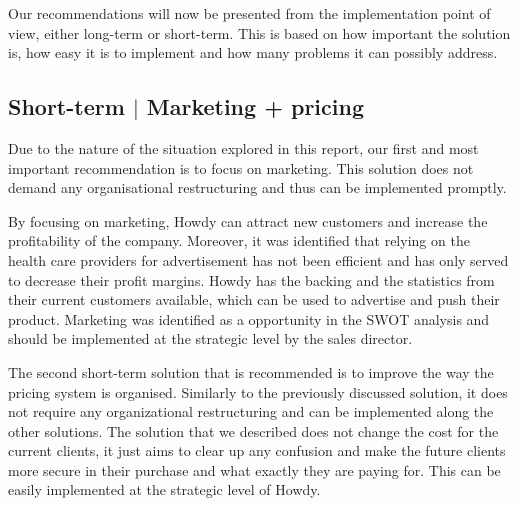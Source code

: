 Our recommendations will now be presented from the implementation point of view, either long-term or short-term. This is based on how important the solution is, how easy it is to implement and how many problems it can possibly address.



\subsection{Short-term $|$ Marketing + pricing}
Due to the nature of the situation explored in this report, our first and most important recommendation is to focus on marketing. This solution does not demand any organisational restructuring and thus can be implemented promptly.

\noindent By focusing on marketing, Howdy can attract new customers and increase the profitability of the company. Moreover, it was identified that relying on the health care providers for advertisement has not been efficient and has only served to decrease their profit margins. Howdy has the backing and the statistics from their current customers available, which can be used to advertise and push their product. Marketing was identified as a opportunity in the SWOT analysis and should be implemented at the strategic level by the sales director.

\noindent The second short-term solution that is recommended is to improve the way the pricing system is organised. Similarly to the previously discussed solution, it does not require any organizational restructuring and can be implemented along the other solutions. The solution that we described does not change the cost for the current clients, it just aims to clear up any confusion and make the future clients more secure in their purchase and what exactly they are paying for. This can be easily implemented at the strategic level of Howdy. 


